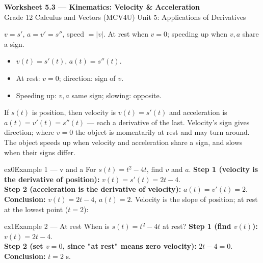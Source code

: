 \documentclass[11pt]{article}
\begin{document}
\begin{center}
{\LARGE\bfseries\color{titleblue}Worksheet 5.3 --- Kinematics: Velocity \& Acceleration}\\[2pt]
{\small Grade 12 Calculus and Vectors (MCV4U) \textperiodcentered{} Unit 5: Applications of Derivatives}
\end{center}

\begin{ideabox}
$v=s'$, $a=v'=s''$, speed $=|v|$. At rest when $v=0$; speeding up when $v,a$ share a sign.
\begin{itemize}[leftmargin=*,itemsep=2pt]
  \item $v(t)=s'(t)$, $a(t)=s''(t)$.
  \item At rest: $v=0$; direction: sign of $v$.
  \item Speeding up: $v,a$ same sign; slowing: opposite.
\end{itemize}
\end{ideabox}

\begin{learnbox}
If $s(t)$ is position, then velocity is $v(t)=s'(t)$ and acceleration is $a(t)=v'(t)=s''(t)$ — each a derivative of the last.
Velocity's sign gives direction; where $v=0$ the object is momentarily at rest and may turn around.
The object speeds up when velocity and acceleration share a sign, and slows when their signs differ.
\end{learnbox}


\begin{example}{ex0}{Example 1 --- v and a}
For $s(t)=t^2-4t$, find $v$ and $a$.\soln
\textbf{Step 1 (velocity is the derivative of position):} $v(t)=s'(t)=2t-4$.\\[3pt]
\textbf{Step 2 (acceleration is the derivative of velocity):} $a(t)=v'(t)=2$.\\[3pt]
\textbf{Conclusion:} $v(t)=2t-4$, $a(t)=2$. Velocity is the slope of position; at rest at the lowest point ($t=2$):
\end{example}

\begin{example}{ex1}{Example 2 --- At rest}
When is $s(t)=t^2-4t$ at rest?\soln
\textbf{Step 1 (find $v(t)$):} $v(t)=2t-4$.\\[3pt]
\textbf{Step 2 (set $v=0$, since "at rest" means zero velocity):} $2t-4=0$.\\[3pt]
\textbf{Conclusion:} $t=2$ s.
\end{example}
\end{document}
